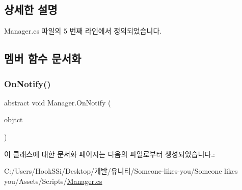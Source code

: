 \subsection{상세한 설명}


Manager.\+cs 파일의 5 번째 라인에서 정의되었습니다.



\subsection{멤버 함수 문서화}
\mbox{\label{class_manager_af8f781331eb3451725d6b0a78131de19}} 
\subsubsection{\texorpdfstring{OnNotify()}{OnNotify()}}
{\footnotesize\ttfamily abstract void Manager.\+On\+Notify (\begin{DoxyParamCaption}\item[{Game\+Object}]{objtct }\end{DoxyParamCaption})\hspace{0.3cm}{\ttfamily [pure virtual]}}



이 클래스에 대한 문서화 페이지는 다음의 파일로부터 생성되었습니다.\+:\begin{DoxyCompactItemize}
\item 
C\+:/\+Users/\+Hook\+S\+Si/\+Desktop/개발/유니티/\+Someone-\/likes-\/you/\+Someone likes you/\+Assets/\+Scripts/\mbox{\hyperlink{_manager_8cs}{Manager.\+cs}}\end{DoxyCompactItemize}

